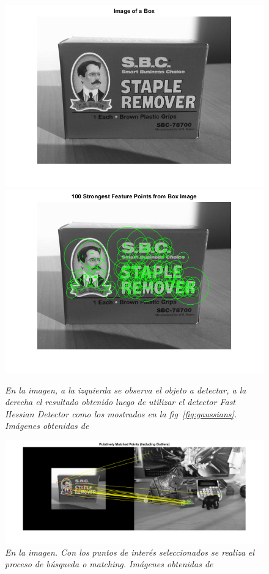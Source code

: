 \begin{figure}[H]
  \centering
  \includegraphics[scale=.4]{images/surfbox}
  \includegraphics[scale=.4]{images/surfedbox}
  \caption{\em En la imagen, a la izquierda se observa el objeto a detectar, a la derecha el resultado obtenido luego de utilizar el detector \textit{Fast Hessian Detector} como los mostrados en la fig~\ref{fig:gaussians}. Imágenes obtenidas de \cite{matlab2014} }   \label{fig:surfbox}
\end{figure}

\begin{figure}[H]
  \centering
  \includegraphics[scale=.4]{images/surfmatching}
  \caption{\em En la imagen. Con los puntos de interés seleccionados se realiza el proceso de búsqueda o \textit{matching}. Imágenes obtenidas de \cite{matlab2014} }   
\label{fig:surfmatching}
\end{figure}

